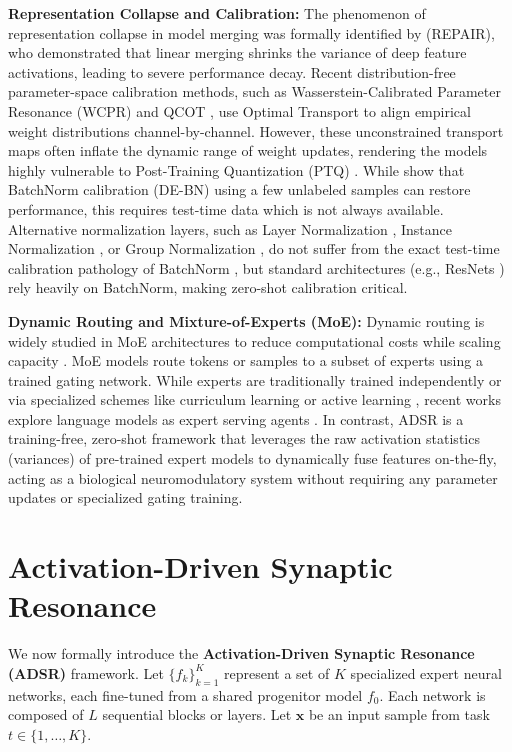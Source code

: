 \documentclass{article}
\theoremstyle{plain}
\theoremstyle{definition}
\theoremstyle{remark}
\begin{document}
\textbf{Representation Collapse and Calibration:} The phenomenon of representation collapse in model merging was formally identified by \citet{jordan23repair} (REPAIR), who demonstrated that linear merging shrinks the variance of deep feature activations, leading to severe performance decay. Recent distribution-free parameter-space calibration methods, such as Wasserstein-Calibrated Parameter Resonance (WCPR) and QCOT \cite{leclaire24wasserstein}, use Optimal Transport to align empirical weight distributions channel-by-channel. However, these unconstrained transport maps often inflate the dynamic range of weight updates, rendering the models highly vulnerable to Post-Training Quantization (PTQ) \cite{xiao23smoothquant, dettmers22llmint8, frantar23gptq}. While \citet{choshen23fusing} show that BatchNorm calibration (DE-BN) using a few unlabeled samples can restore performance, this requires test-time data which is not always available. Alternative normalization layers, such as Layer Normalization \cite{ba16layer}, Instance Normalization \cite{ulyanov16instance}, or Group Normalization \cite{wu18group}, do not suffer from the exact test-time calibration pathology of BatchNorm \cite{ioffe15batchnorm}, but standard architectures (e.g., ResNets \cite{he16resnet}) rely heavily on BatchNorm, making zero-shot calibration critical.

\textbf{Dynamic Routing and Mixture-of-Experts (MoE):} Dynamic routing is widely studied in MoE architectures to reduce computational costs while scaling capacity \cite{shazeer17outrageously, fedus21switch}. MoE models route tokens or samples to a subset of experts using a trained gating network. While experts are traditionally trained independently or via specialized schemes like curriculum learning \cite{bengio09curriculum} or active learning \cite{gallego20active}, recent works explore language models as expert serving agents \cite{yu23language}. In contrast, ADSR is a training-free, zero-shot framework that leverages the raw activation statistics (variances) of pre-trained expert models to dynamically fuse features on-the-fly, acting as a biological neuromodulatory system without requiring any parameter updates or specialized gating training.

\section{Activation-Driven Synaptic Resonance}
\label{sec:methodology}

We now formally introduce the \textbf{Activation-Driven Synaptic Resonance (ADSR)} framework. Let $\{f_k\}_{k=1}^K$ represent a set of $K$ specialized expert neural networks, each fine-tuned from a shared progenitor model $f_0$. Each network is composed of $L$ sequential blocks or layers. Let $\mathbf{x}$ be an input sample from task $t \in \{1, \dots, K\}$.
\end{document}
